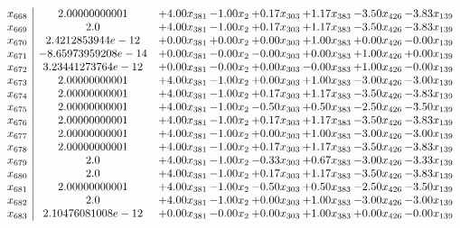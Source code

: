 \documentclass[8pt]{article}
\begin{document}
\[\begin{array}{c| c c@{\hskip 2pt} c@{\hskip 2pt} c@{\hskip 2pt} c@{\hskip 2pt} c@{\hskip 2pt} c@{\hskip 2pt} }
 x_{668}   &  2.00000000001 & +  4.00 x_{381} & -1.00 x_{2} & +  0.17 x_{303} & +  1.17 x_{383} & -3.50 x_{426} & -3.83 x_{139}\\
 x_{669}   &  2.0 & +  4.00 x_{381} & -1.00 x_{2} & +  0.17 x_{303} & +  1.17 x_{383} & -3.50 x_{426} & -3.83 x_{139}\\
 x_{670}   &  2.4212853944e-12 & +  0.00 x_{381} & +  0.00 x_{2} & +  0.00 x_{303} & +  1.00 x_{383} & +  0.00 x_{426} & -0.00 x_{139}\\
 x_{671}   &  -8.65973959208e-14 & +  0.00 x_{381} & -0.00 x_{2} & -0.00 x_{303} & +  0.00 x_{383} & +  1.00 x_{426} & +  0.00 x_{139}\\
 x_{672}   &  3.23441273764e-12 & +  0.00 x_{381} & -0.00 x_{2} & +  0.00 x_{303} & -0.00 x_{383} & +  1.00 x_{426} & -0.00 x_{139}\\
 x_{673}   &  2.00000000001 & +  4.00 x_{381} & -1.00 x_{2} & +  0.00 x_{303} & +  1.00 x_{383} & -3.00 x_{426} & -3.00 x_{139}\\
 x_{674}   &  2.00000000001 & +  4.00 x_{381} & -1.00 x_{2} & +  0.17 x_{303} & +  1.17 x_{383} & -3.50 x_{426} & -3.83 x_{139}\\
 x_{675}   &  2.00000000001 & +  4.00 x_{381} & -1.00 x_{2} & -0.50 x_{303} & +  0.50 x_{383} & -2.50 x_{426} & -3.50 x_{139}\\
 x_{676}   &  2.00000000001 & +  4.00 x_{381} & -1.00 x_{2} & +  0.17 x_{303} & +  1.17 x_{383} & -3.50 x_{426} & -3.83 x_{139}\\
 x_{677}   &  2.00000000001 & +  4.00 x_{381} & -1.00 x_{2} & +  0.00 x_{303} & +  1.00 x_{383} & -3.00 x_{426} & -3.00 x_{139}\\
 x_{678}   &  2.00000000001 & +  4.00 x_{381} & -1.00 x_{2} & +  0.17 x_{303} & +  1.17 x_{383} & -3.50 x_{426} & -3.83 x_{139}\\
 x_{679}   &  2.0 & +  4.00 x_{381} & -1.00 x_{2} & -0.33 x_{303} & +  0.67 x_{383} & -3.00 x_{426} & -3.33 x_{139}\\
 x_{680}   &  2.0 & +  4.00 x_{381} & -1.00 x_{2} & +  0.17 x_{303} & +  1.17 x_{383} & -3.50 x_{426} & -3.83 x_{139}\\
 x_{681}   &  2.00000000001 & +  4.00 x_{381} & -1.00 x_{2} & -0.50 x_{303} & +  0.50 x_{383} & -2.50 x_{426} & -3.50 x_{139}\\
 x_{682}   &  2.0 & +  4.00 x_{381} & -1.00 x_{2} & +  0.00 x_{303} & +  1.00 x_{383} & -3.00 x_{426} & -3.00 x_{139}\\
 x_{683}   &  2.10476081008e-12 & +  0.00 x_{381} & -0.00 x_{2} & +  0.00 x_{303} & +  1.00 x_{383} & +  0.00 x_{426} & -0.00 x_{139}\\

\end{array}\]
\end{document}
